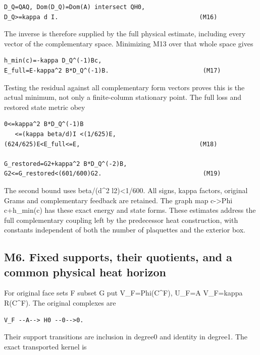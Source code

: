 \documentclass[11pt,a4paper]{article}
\renewcommand{\[}{\begingroup\small\originaldisplaystart}
\renewcommand{\]}{\originaldisplayend\endgroup}
\begin{document}
\begin{verbatim}
D_Q=QAQ, Dom(D_Q)=Dom(A) intersect QH0,
D_Q>=kappa d I.                                       (M16)
\end{verbatim}

The inverse is therefore supplied by the full physical estimate,
including every vector of the complementary space. Minimizing M13 over
that whole space gives

\begin{verbatim}
h_min(c)=-kappa D_Q^(-1)Bc,
E_full=E-kappa^2 B*D_Q^(-1)B.                          (M17)
\end{verbatim}

Testing the residual against all complementary form vectors proves this
is the actual minimum, not only a finite-column stationary point. The
full loss and restored state metric obey

\begin{verbatim}
0<=kappa^2 B*D_Q^(-1)B
   <=(kappa beta/d)I <(1/625)E,
(624/625)E<E_full<=E,                                 (M18)

G_restored=G2+kappa^2 B*D_Q^(-2)B,
G2<=G_restored<(601/600)G2.                            (M19)
\end{verbatim}

The second bound uses beta/(d\^{}2 l2)\textless1/600. All signs, kappa
factors, original Grams and complementary feedback are retained. The
graph map c-\textgreater Phi c+h\_min(c) has these exact energy and
state forms. These estimates address the full complementary coupling
left by the predecessor heat construction, with constants independent of
both the number of plaquettes and the exterior box.

\subsection{M6. Fixed supports, their quotients, and a common physical
heat
horizon}\label{m6.-fixed-supports-their-quotients-and-a-common-physical-heat-horizon}

For original face sets F subset G put V\_F=Phi(C\^{}F), U\_F=A
V\_F=kappa R(C\^{}F). The original complexes are

\begin{verbatim}
V_F --A--> H0 --0-->0.
\end{verbatim}

Their support transitions are inclusion in degree0 and identity in
degree1. The exact transported kernel is
\end{document}
